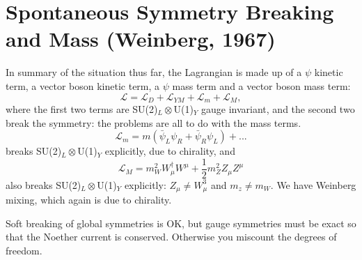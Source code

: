 
\section{Spontaneous Symmetry Breaking and Mass (Weinberg, 1967)}
%
In summary of the situation thus far, the Lagrangian is made up of a $\psi$ kinetic term, a vector boson kinetic term, a $\psi$ mass term and a vector boson mass term:
\begin{equation}
\mathcal{L} = \mathcal{L}_D + \mathcal{L}_{YM} + \mathcal{L}_m + \mathcal{L}_M,
\end{equation}
where the first two terms are SU(2)$_L \otimes$U(1)$_Y$ gauge invariant, and the
second two break the symmetry: the problems are all to do with the mass terms.
\begin{equation}
\mathcal{L}_m = m(\bar{\psi}_L \psi_R + \bar{\psi}_R \psi_L) + ...
\end{equation}
breaks SU(2)$_L \otimes$U(1)$_Y$ explicitly, due to chirality, and
\begin{equation}
\mathcal{L}_M = m_W^2W_\mu^\dagger W^\mu + \frac{1}{2}m_Z^2 Z_\mu Z^\mu 
\end{equation}
also breaks SU(2)$_L \otimes$U(1)$_Y$ explicitly: $Z_\mu \neq W_\mu^3$ and $m_z \neq m_W$. We have Weinberg mixing, which again is due to chirality. 

Soft breaking of global symmetries is OK, but gauge symmetries must be exact so that the Noether current is conserved. Otherwise you miscount the degrees of freedom.
%
